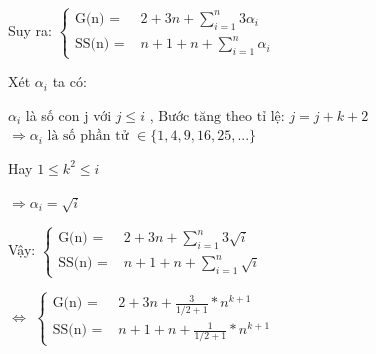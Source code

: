 \documentclass{article}
\newcommand\tab[1][1cm]{\hspace*{#1}}
\begin{document}
\tab Suy ra:
\(
\begin{cases}
    \text{G(n) = } & 2 + 3n +  \sum\limits_{i=1}^{n}3\alpha_{i} \\
    \text{SS(n) = } &  n + 1 + n  + \sum\limits_{i=1}^{n}\alpha_{i} 
\end{cases}
\)

\vspace{15mm}
Xét $\alpha_{i}$ ta có:

\tab $\alpha_{i}$ là số con j với $j \leq i $ , \(\text{Bước tăng theo tỉ lệ: } j = j + k + 2\)\\

\(\Rightarrow  \alpha_{i} \text{ là số phần tử } \in \{ 1, 4, 9, 16, 25, ...\}\) 
\vspace{5mm}

Hay $ 1 \leq k^2 \leq i$
\vspace{5mm}

\(\Rightarrow  \alpha_{i} = \sqrt{i}\)


\vspace{5mm}
\tab Vậy:
\(
\begin{cases}
    \text{G(n) = } & 2 + 3n +  \sum\limits_{i=1}^{n}3\sqrt{i} \\
    \text{SS(n) = } &  n + 1 + n  + \sum\limits_{i=1}^{n}\sqrt{i} 
\end{cases}
\)

\vspace{5mm}
\tab  $\Leftrightarrow $
\(
\begin{cases}
    \text{G(n) = } & 2 + 3n +  \frac{3}{1/2 + 1}*n^{k+1} \\

    \text{SS(n) = } &  n + 1 + n  + \frac{1}{1/2 + 1}*n^{k+1} 
\end{cases}
\)
\end{document}
